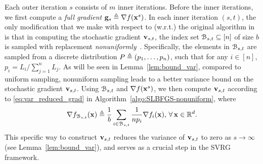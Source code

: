 \documentclass[10pt,twocolumn,journal]{IEEEtran}
\begin{document}
Each outer iteration $s$ consists of $m$ inner iterations. Before the inner iterations, we first compute a {\em full gradient} $\mathbf{g}_s \triangleq\nabla f(\mathbf{x}^s)$.  In each inner iteration $(s,t)$, the only modification that we make with respect to (w.r.t.) the original algorithm in~\cite{Moritz_16} is that in computing the stochastic gradient $\mathbf{v}_{s,t}$, the index set $\mathcal{B}_{s,t}\subseteq [n]$ of size $b$ is sampled with replacement {\em nonuniformly}~\cite{Xiao_14,Zhao_15}. Specifically, the elements in $\mathcal{B}_{s,t}$ are sampled \iid from a discrete distribution $P\triangleq(p_1,\ldots,p_n)$, such that for any $i\in[n]$, $p_i={L_i}/{\sum_{j=1}^nL_j}$. As will be seen in Lemma~\ref{lem:bound_var}, compared to uniform sampling, nonuniform sampling leads to a better variance bound on the stochastic gradient $\mathbf{v}_{s,t}$. 
Using $\mathcal{B}_{s,t}$ and $\nabla f(\mathbf{x}^s)$, we then compute $\mathbf{v}_{s,t}$ according to \eqref{eq:var_reduced_grad} in Algorithm~\ref{algo:SLBFGS-nonuniform},
where %
\begin{equation}
\nabla f_{\calB_{s,t}}(\bx) \defeq \frac{1}{b}\sum_{i\in\calB_{s,t}} \frac{1}{np_i}\nabla f_i(\bx), \,\forall\,\bx\in\bbR^d. \label{eq:mb_gradient} %
\end{equation}
This specific way to construct $\mathbf{v}_{s,t}$ reduces the variance of $\mathbf{v}_{s,t}$ to zero as $s\to\infty$ (see Lemma~\ref{lem:bound_var}), and serves as a crucial step in the SVRG framework. %
 
\end{document}
